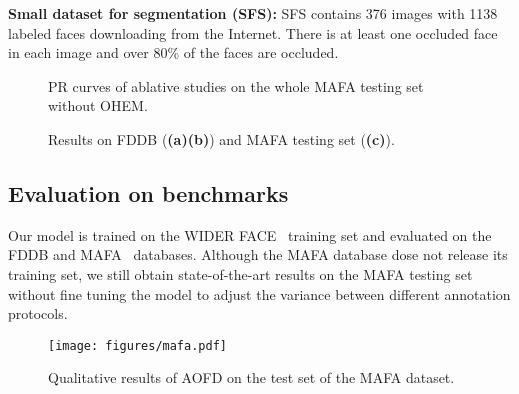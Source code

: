 \documentclass[10pt,twocolumn,letterpaper]{article}
\begin{document}
\textbf{Small dataset for segmentation (SFS):} SFS contains 376 images with 1138 labeled faces downloading from the Internet. There is at least one occluded face in each image and over 80\% of the faces are occluded.



\begin{figure*}[t]
\centering     
{}
\caption{PR curves of ablative studies on the whole MAFA testing set without OHEM.}
\label{fig:ablativeROC}
\end{figure*}

\begin{figure*}[t]
\centering     
{}
\caption{Results on FDDB ({\bf (a)(b)}) and MAFA testing set ({\bf (c)}).}
\label{fig:fddb}
\end{figure*}






\subsection{Evaluation on benchmarks}
Our model is trained on the WIDER FACE~\cite{yang2016wider} training set and evaluated on the FDDB and MAFA~\cite{ge2017detecting} databases. Although the MAFA database dose not release its training set, we still obtain state-of-the-art results on the MAFA testing set without fine tuning the model to adjust the variance between different annotation protocols. 





\begin{figure*}[t]
	\begin{center}
		\texttt{[image: figures/mafa.pdf]}
	\end{center}
	\vspace{-6pt}
	\caption{Qualitative results of AOFD on the test set of the MAFA dataset.}
	\vspace{-10pt}
	\label{fig:mafademo}
\end{figure*}
\end{document}

